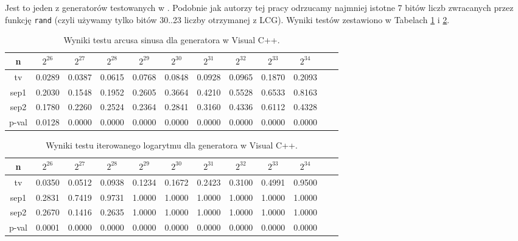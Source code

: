 \documentclass[a4paper,11pt,twoside]{book}
\theoremstyle{definition}
\begin{document}
Jest to jeden z generatorów testowanych w \cite{wang-nic}. Podobnie jak autorzy tej pracy odrzucamy najmniej istotne 7 bitów liczb zwracanych przez funkcję \texttt{rand} (czyli używamy tylko bitów 30..23 liczby otrzymanej z LCG). Wyniki testów zestawiono w Tabelach \ref{tab:svis_asin} i \ref{tab:svis_lil}.

\begin{table}[ht!]
\centering
 \caption{Wyniki testu arcusa sinusa dla generatora w Visual C++.}
 \label{tab:svis_asin}
\begin{tabular} {||c|c|c|c|c|c|c|c|c|c|c|c||}  
 \hline
     n &  $2^{26}$ &  $2^{27}$ &  $2^{28}$ &  $2^{29}$ &  $2^{30}$ &  $2^{31}$ &  $2^{32}$ &  $2^{33}$ &  $2^{34}$\\ \hline
     tv &  0.0289 &  0.0387 &  0.0615 &  0.0768 &  0.0848 &  0.0928 &  0.0965 &  0.1870 &  0.2093\\ \hline
   sep1 &  0.2030 &  0.1548 &  0.1952 &  0.2605 &  0.3664 &  0.4210 &  0.5528 &  0.6533 &  0.8163\\ \hline
   sep2 &  0.1780 &  0.2260 &  0.2524 &  0.2364 &  0.2841 &  0.3160 &  0.4336 &  0.6112 &  0.4328\\ \hline
  p-val &  0.0128 &  0.0000 &  0.0000 &  0.0000 &  0.0000 &  0.0000 &  0.0000 &  0.0000 &  0.0000\\ \hline 
\end{tabular}  
\end{table}

\begin{table}[ht!]
\centering
 \caption{Wyniki testu iterowanego logarytmu dla generatora w Visual C++.}
 \label{tab:svis_lil}
\begin{tabular} {||c|c|c|c|c|c|c|c|c|c|c|c||}  
 \hline 
     n &  $2^{26}$ &  $2^{27}$ &  $2^{28}$ &  $2^{29}$ &  $2^{30}$ &  $2^{31}$ &  $2^{32}$ &  $2^{33}$ &  $2^{34}$\\ \hline
     tv &  0.0350 &  0.0512 &  0.0938 &  0.1234 &  0.1672 &  0.2423 &  0.3100 &  0.4991 &  0.9500\\ \hline
   sep1 &  0.2831 &  0.7419 &  0.9731 &  1.0000 &  1.0000 &  1.0000 &  1.0000 &  1.0000 &  1.0000\\ \hline
   sep2 &  0.2670 &  0.1416 &  0.2635 &  1.0000 &  1.0000 &  1.0000 &  1.0000 &  1.0000 &  1.0000\\ \hline
  p-val &  0.0001 &  0.0000 &  0.0000 &  0.0000 &  0.0000 &  0.0000 &  0.0000 &  0.0000 &  0.0000\\ \hline
\end{tabular}  
\end{table}
\end{document}

